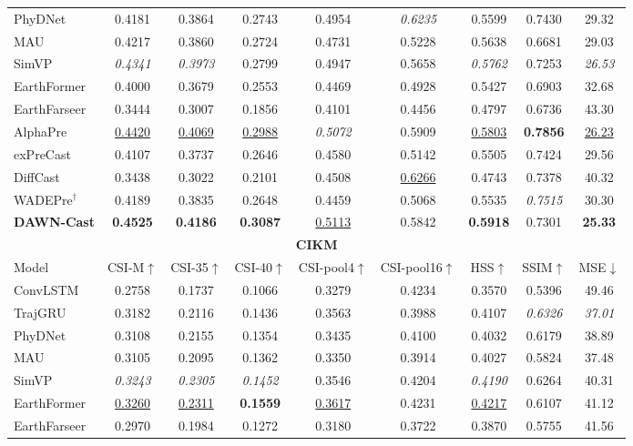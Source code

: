 \begin{table}[t]
{\begin{tabular}{l|cccccccc}
PhyDNet & 0.4181 & 0.3864 & 0.2743 & 0.4954 & \textit{0.6235} & 0.5599 & 0.7430 & 29.32 \\
MAU & 0.4217 & 0.3860 & 0.2724 & 0.4731 & 0.5228 & 0.5638 & 0.6681 & 29.03 \\
SimVP & \textit{0.4341} & \textit{0.3973} & 0.2799 & 0.4947 & 0.5658 & \textit{0.5762} & 0.7253 & \textit{26.53} \\
EarthFormer & 0.4000 & 0.3679 & 0.2553 & 0.4469 & 0.4928 & 0.5427 & 0.6903 & 32.68 \\
EarthFarseer & 0.3444 & 0.3007 & 0.1856 & 0.4101 & 0.4456 & 0.4797 & 0.6736 & 43.30 \\
AlphaPre & \underline{0.4420} & \underline{0.4069} & \underline{0.2988} & \textit{0.5072} & 0.5909 & \underline{0.5803} & \textbf{0.7856} & \underline{26.23} \\
exPreCast & 0.4107 & 0.3737 & 0.2646 & 0.4580 & 0.5142 & 0.5505 & 0.7424 & 29.56 \\
DiffCast & 0.3438 & 0.3022 & 0.2101 & 0.4508 & \underline{0.6266} & 0.4743 & 0.7378 & 40.32 \\
WADEPre$^{\dagger}$ & 0.4189 & 0.3835 & 0.2648 & 0.4459 & 0.5068 & 0.5535 & \textit{0.7515} & 30.30 \\
\textbf{DAWN-Cast} & \textbf{0.4525} & \textbf{0.4186} & \textbf{0.3087} & \underline{0.5113} & 0.5842 & \textbf{0.5918} & 0.7301 & \textbf{25.33} \\
\midrule
\multicolumn{9}{c}{\textbf{CIKM}} \\
\midrule
Model & CSI-M$\uparrow$ & CSI-35$\uparrow$ & CSI-40$\uparrow$ & CSI-pool4$\uparrow$ & CSI-pool16$\uparrow$ & HSS$\uparrow$ & SSIM$\uparrow$ & MSE$\downarrow$ \\
\midrule
ConvLSTM & 0.2758 & 0.1737 & 0.1066 & 0.3279 & 0.4234 & 0.3570 & 0.5396 & 49.46 \\
TrajGRU & 0.3182 & 0.2116 & 0.1436 & 0.3563 & 0.3988 & 0.4107 & \textit{0.6326} & \textit{37.01} \\
PhyDNet & 0.3108 & 0.2155 & 0.1354 & 0.3435 & 0.4100 & 0.4032 & 0.6179 & 38.89 \\
MAU & 0.3105 & 0.2095 & 0.1362 & 0.3350 & 0.3914 & 0.4027 & 0.5824 & 37.48 \\
SimVP & \textit{0.3243} & \textit{0.2305} & \textit{0.1452} & 0.3546 & 0.4204 & \textit{0.4190} & 0.6264 & 40.31 \\
EarthFormer & \underline{0.3260} & \underline{0.2311} & \textbf{0.1559} & \underline{0.3617} & 0.4231 & \underline{0.4217} & 0.6107 & 41.12 \\
EarthFarseer & 0.2970 & 0.1984 & 0.1272 & 0.3180 & 0.3722 & 0.3870 & 0.5755 & 41.56 \\

\end{tabular}}
\end{table}
